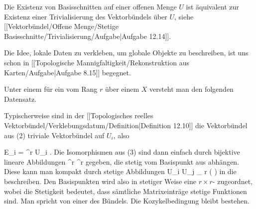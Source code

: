 Die Existenz von
 {} {}
Basisschnitten auf einer offenen Menge $U$ ist äquivalent zur Existenz einer
 {} {}
Trivialisierung des Vektorbündels über $U$, siehe
[[Vektorbündel/Offene Menge/Stetige Basisschnitte/Trivialisierung/Aufgabe|Aufgabe 12.14]].


Die Idee, lokale Daten zu verkleben, um globale Objekte zu beschreiben, ist uns schon in
[[Topologische Mannigfaltigkeit/Rekonstruktion aus Karten/Aufgabe|Aufgabe 8.15]]
begegnet.

{}
{

Unter einem
für ein
vom Rang $r$ über einem
$X$ versteht man den folgenden Datensatz.

}

{}
{

Typischerweise sind in der
[[Topologisches reelles Vektorbündel/Verklebungsdatum/Definition|Definition 12.10]]
die Vektorbündel aus (2) triviale Vektorbündel auf $U_i$, also

\mavergleichskette
{\vergleichskette
{E_i
}
{ = }{ \R^r \times U_i
}
{  }{
}
{    }{
}
{   }{
}
}
{}{}{.}
Die Isomorphismen aus (3) sind dann einfach durch bijektive lineare Abbildungen
 { \R^r} { \R^r
} {}
gegeben, die stetig vom Basispunkt aus
 abhängen. Diese kann man kompakt durch stetige Abbildungen
 {U_i \cap U_j } { _{  r   } \! \left(  \R  \right)
} {}
in die
beschreiben. Den Basispunkten wird also in stetiger Weise eine
$r \times r$-
zugeordnet, wobei die Stetigkeit bedeutet, dass sämtliche Matrixeinträge stetige Funktionen sind. Man spricht von einer  {} des Bündels. Die Kozykelbedingung bleibt bestehen.

}

